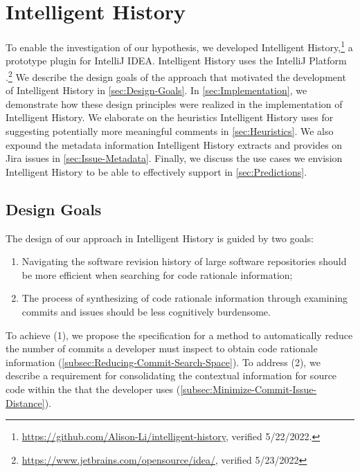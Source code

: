 \chapter{Intelligent History}
\label{ch:Intelligent-History}

To enable the investigation of our hypothesis, we developed Intelligent History,\footnote{\url{https://github.com/Alison-Li/intelligent-history}, verified 5/22/2022.} a prototype plugin for IntelliJ IDEA.
Intelligent History uses the IntelliJ Platform .\footnote{\url{https://www.jetbrains.com/opensource/idea/}, verified 5/23/2022}
We describe the design goals of the approach that motivated the development of Intelligent History in \autoref{sec:Design-Goals}. 
In \autoref{sec:Implementation}, we demonstrate how these design principles were realized in the implementation of Intelligent History. 
We elaborate on the heuristics Intelligent History uses
for suggesting potentially more meaningful comments in \autoref{sec:Heuristics}.
We also expound the metadata information Intelligent History extracts and provides on Jira issues in \autoref{sec:Issue-Metadata}. 
Finally, we discuss the use cases we envision Intelligent History to be able to effectively support in \autoref{sec:Predictions}.

\section{Design Goals}
\label{sec:Design-Goals}

The design of our approach in Intelligent History is guided by two goals: 

\begin{enumerate}[label={(\arabic*)}]
    \item Navigating the software revision history of large software repositories should be more efficient when searching for code rationale information;
    \item The process of synthesizing of code rationale information through examining commits and issues should be less cognitively burdensome.
\end{enumerate}

To achieve (1), we propose the specification for a method to automatically reduce the number of commits a developer must inspect to obtain code rationale information (\autoref{subsec:Reducing-Commit-Search-Space}).
To address (2), we describe a requirement for consolidating the contextual information for source code within the  that the developer uses (\autoref{subsec:Minimize-Commit-Issue-Distance}).

